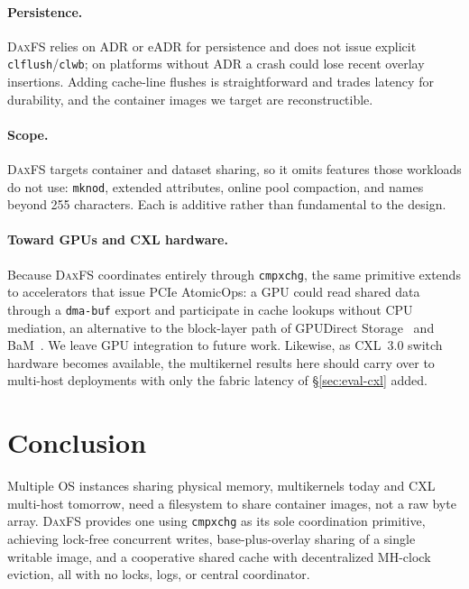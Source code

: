 \documentclass[letterpaper,twocolumn,10pt]{article}
\newcommand{\daxfs}{\textsc{DaxFS}\xspace}
\begin{document}
\paragraph{Persistence.}
\daxfs relies on ADR or eADR for persistence and does not issue explicit
\texttt{clflush}/\texttt{clwb}; on platforms without ADR a crash could
lose recent overlay insertions.  Adding cache-line flushes is
straightforward and trades latency for durability, and the container
images we target are reconstructible.

\paragraph{Scope.}
\daxfs targets container and dataset sharing, so it omits features those
workloads do not use: \texttt{mknod}, extended attributes, online pool
compaction, and names beyond 255 characters.  Each is additive rather
than fundamental to the design.

\paragraph{Toward GPUs and CXL hardware.}
Because \daxfs coordinates entirely through \texttt{cmpxchg}, the same
primitive extends to accelerators that issue PCIe AtomicOps: a GPU could
read shared data through a \texttt{dma-buf} export and participate in
cache lookups without CPU mediation, an alternative to the block-layer
path of GPUDirect Storage~\cite{gpudirect:storage} and
BaM~\cite{bam23:gpussd}.  We leave GPU integration to future work.
Likewise, as CXL~3.0 switch hardware becomes available, the multikernel
results here should carry over to multi-host deployments with only the
fabric latency of \S\ref{sec:eval-cxl} added.

\section{Conclusion}
\label{sec:conclusion}

Multiple OS instances sharing physical memory, multikernels today and
CXL multi-host tomorrow, need a filesystem to share container images,
not a raw byte array.  \daxfs provides one using \texttt{cmpxchg} as its
sole coordination primitive, achieving lock-free concurrent writes,
base-plus-overlay sharing of a single writable image, and a cooperative
shared cache with decentralized MH-clock eviction, all with no locks,
logs, or central coordinator.
\end{document}
